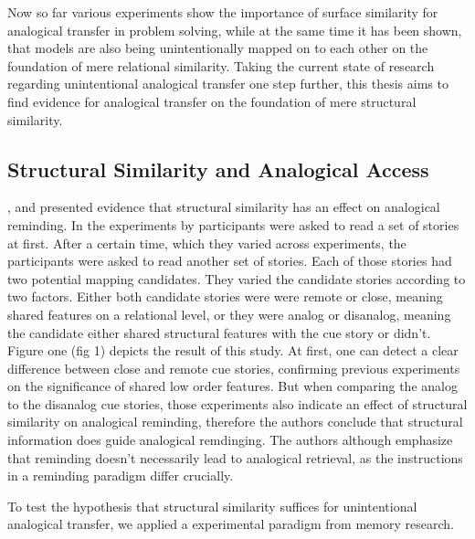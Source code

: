 \documentclass[a4paper,man,natbib,floatsintext,import]{apa6}
\begin{document}

Now so far various experiments show the importance of surface similarity for analogical transfer in problem solving, while at the same time it has been shown, that models are also being unintentionally mapped on to each other on the foundation of mere relational similarity. Taking the current state of research regarding unintentional analogical transfer one step further, this thesis aims to find evidence for analogical transfer on the foundation of mere structural similarity.


\subsection{Structural Similarity and Analogical Access}
\cite{Holyoak1987}, \cite{Johnson1992} and \cite{Wharton1996} presented evidence that structural similarity has an effect on analogical reminding. In the experiments by \cite{Wharton1996} participants were asked to read a set of stories at first. After a certain time, which they varied across experiments, the participants were asked to read another set of stories. Each of those stories had two potential mapping candidates. They varied the candidate stories according to two factors. Either both candidate stories were were remote or close, meaning shared features on a relational level, or they were analog or disanalog, meaning the candidate either shared structural features with the cue story or didn't. Figure one (fig 1) depicts the result of this study. At first, one can detect a clear difference between close and remote cue stories, confirming previous experiments on the significance of shared low order features. But when comparing the analog to the disanalog cue stories, those experiments also indicate an effect of structural similarity on analogical reminding, therefore the authors conclude that structural information does guide analogical remdinging. The authors although emphasize that reminding doesn't necessarily lead to analogical retrieval, as the instructions in a reminding paradigm differ crucially.

To test the hypothesis that structural similarity suffices for unintentional analogical transfer, we applied a experimental paradigm from memory research.
\end{document}
